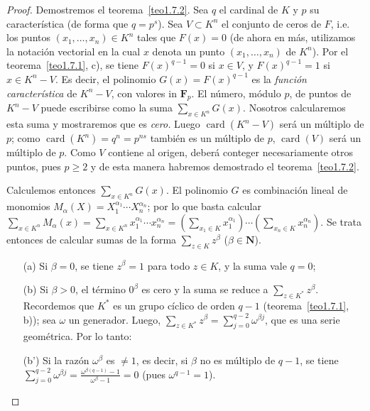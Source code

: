 \documentclass[10pt,oneside,bibtotoc,smallheadings,leqno,a5paper,DIV=12]{scrbook}
\newcommand{\NN}{\mathbf{N}}
\newcommand{\FF}{\mathbf{F}}
\DeclareMathOperator{\card}{card}
\numberwithin{equation}{section}
\theoremstyle{defi}
\theoremstyle{enonce}
\theoremstyle{rem}
\numberwithin{theorem}{section}
\numberwithin{proposition}{section}
\numberwithin{definition}{section}
\numberwithin{lemma}{section}
\numberwithin{corollary}{section}
\numberwithin{example}{section}
\numberwithin{footnote}{section}%
\begin{document}
\begin{proof}
Demostremos el teorema~\ref{teo1.7.2}. Sea $q$ el cardinal de $K$ y $p$ su caracter\'istica (de forma que
$q = p^{s}$). Sea $V\subset K^{n}$ el conjunto de ceros de $F$, i.e. los puntos $(x_{1},\dots,x_{n})\in K^{n}$
tales que $F(x) = 0$ (de ahora en m\'as, utilizamos la notaci\'on vectorial en la cual $x$ denota
un punto $(x_{1},\dots,x_{n})$ de $K^{n}$). Por el teorema~\ref{teo1.7.1}, c),
se tiene $F(x)^{q-1} = 0$ si $x\in V$,
y $F(x)^{q-1} = 1$ si $x\in K^{n}-V$. Es decir, el polinomio $G(x) = F(x)^{q-1}$ es la
{\em funci\'on caracter\'istica} de $K^{n}-V$, con valores in $\FF_{p}$. El n\'umero, m\'odulo $p$,
de puntos de $K^{n}-V$ puede escribirse como la suma $\sum_{x\in K^{n}}G(x)$. Nosotros calcularemos esta
suma y mostraremos que es {\em cero.} Luego $\card(K^{n}-V)$ ser\'a un m\'ultiplo de $p$; como $\card(K^{n})
=q^{n}=p^{ns}$ tambi\'en es un m\'ultiplo de $p$, $\card(V)$ ser\'a un m\'ultiplo de $p$. Como $V$ contiene
al origen, deber\'a conteger necesariamente otros puntos, pues $p\geq 2$ y de esta manera habremos demostrado
el teorema~\ref{teo1.7.2}.

Calculemos entonces $\sum_{x\in K^{n}}G(x)$. El polinomio $G$ es combinaci\'on lineal de monomios
$M_{\alpha}(X) = X_{1}^{\alpha_{1}}\cdots X_{n}^{\alpha_{n}}$; por lo que basta calcular
$\sum_{x\in K^{n}}M_{\alpha}(x) = \sum_{x\in K^{n}}x_{1}^{\alpha_{1}}\cdots x_{n}^{\alpha_{n}}
= \left(\sum_{x_{1}\in K}x_{1}^{\alpha_{1}}\right)\cdots\left(\sum_{x_{n}\in K}x_{n}^{\alpha_{n}}\right)$.
Se trata entonces de calcular sumas de la forma $\sum_{z\in K}z^{\beta}$ ($\beta\in\NN$).

\begin{enumerate}
\item[(a)] Si $\beta = 0$, se tiene $z^{\beta} =1$ para todo $z\in K$, y la suma vale $q = 0$;

\item[(b)] Si $\beta > 0$, el t\'ermino $0^{\beta}$ es cero y la suma se reduce a $\sum_{z\in K^{*}}z^{\beta}$. Recordemos
que $K^{*}$ es un grupo c\'iclico de orden $q-1$ (teorema~\ref{teo1.7.1}, b));
sea $\omega$ un generador. Luego,
$\sum_{z\in K^{*}}z^{\beta} = \sum_{j=0}^{q-2}\omega^{\beta j}$, que es una serie geom\'etrica. Por lo tanto:

\item[(b')] Si la raz\'on $\omega^{\beta}$ es $\neq 1$, es decir, si $\beta$ no es m\'ultiplo de $q-1$, se tiene
$\sum_{j=0}^{q-2}\omega^{\beta j} = \frac{\omega^{\beta(q-1)}-1}{\omega^{\beta}-1} = 0$ (pues $\omega^{q-1} = 1$).


\end{enumerate}
\end{proof}
\end{document}

